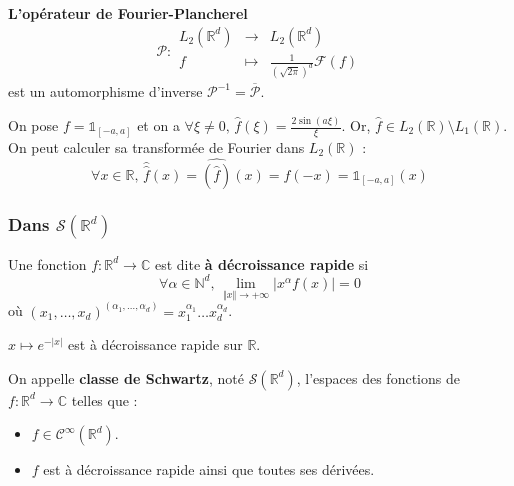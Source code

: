   \begin{theorem}
    \textbf{L'opérateur de Fourier-Plancherel}
    \[
    \mathcal{P} :
    \begin{array}{ccc}
      L_2(\mathbb{R}^d) &\rightarrow& L_2(\mathbb{R}^d) \\
      f &\mapsto& \frac{1}{(\sqrt{2 \pi})^d} \mathcal{F}(f)
    \end{array}
    \]
    est un automorphisme d'inverse $\mathcal{P}^{-1} = \overline{\mathcal{P}}$.
  \end{theorem}


  \begin{example}
    On pose $f = \mathbb{1}_{[-a, a]}$ et on a $\forall \xi \neq 0, \, \widehat{f}(\xi) = \frac{2 \sin(a\xi)}{\xi}$. Or, $\widehat{f} \in L_2(\mathbb{R}) \setminus L_1(\mathbb{R})$. On peut calculer sa transformée de Fourier dans $L_2(\mathbb{R})$ :
    \[ \forall x \in \mathbb{R}, \, \widehat{\widehat{f}}(x) = \widehat{(\widehat{f})}(x) = f(-x) = \mathbb{1}_{[-a, a]}(x) \]
  \end{example}

  \subsubsection{Dans \texorpdfstring{$\mathcal{S}(\mathbb{R}^d)$}{S(Rᵈ)}}


  \begin{definition}
    Une fonction $f : \mathbb{R}^d \rightarrow \mathbb{C}$ est dite \textbf{à décroissance rapide} si
    \[ \forall \alpha \in \mathbb{N}^d, \, \lim_{\Vert x \Vert \rightarrow +\infty} \vert x^\alpha f(x) \vert = 0 \]
    où $(x_1, \dots, x_d)^{(\alpha_1, \dots, \alpha_d)} = x_1^{\alpha_1} \dots x_d^{\alpha_d}$.
  \end{definition}

  \begin{example}
    $x \mapsto e^{-\vert x \vert}$ est à décroissance rapide sur $\mathbb{R}$.
  \end{example}

  \begin{definition}
    On appelle \textbf{classe de Schwartz}, noté $\mathcal{S}(\mathbb{R}^d)$, l'espaces des fonctions de $f : \mathbb{R}^d \rightarrow \mathbb{C}$ telles que :
    \begin{itemize}
      \item $f \in \mathcal{C}^\infty(\mathbb{R}^d)$.
      \item $f$ est à décroissance rapide ainsi que toutes ses dérivées.
    \end{itemize}
  \end{definition}

